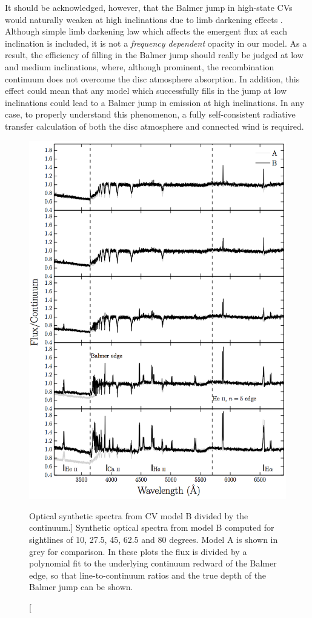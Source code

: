 It should be acknowledged, however,
that the Balmer jump in high-state CVs would naturally weaken at
high inclinations due to limb darkening effects \citep{ladous1989, ladous1989b}. 
Although simple limb darkening law which affects 
the emergent flux at each inclination is included,
it is not a {\em frequency dependent} opacity in our model.
As a result, the efficiency of filling in the Balmer jump
should really be judged at low and medium inclinations, 
where, although prominent, the recombination continuum does
not overcome the disc atmosphere absorption. 
In addition, this effect 
could mean that any model which successfully fills in the 
jump at low inclinations could lead to a Balmer jump 
in emission at high inclinations.
In any case, to properly understand this phenomenon, a fully self-consistent
radiative transfer calculation of both the disc atmosphere
and connected wind is required.

\begin{figure} 
\centering
\includegraphics[width=1.0\textwidth]{figures/05-cvpaper/modelb_opt_cont.png}
\caption
[Optical synthetic spectra from CV model B divided by the continuum.]{
Synthetic optical spectra from model B computed for 
sightlines of 10, 27.5, 45, 62.5 and 80 degrees. 
Model A is shown in grey for comparison.
In these plots the flux is divided by a polynomial fit to the 
underlying continuum redward of the Balmer edge, so that 
line-to-continuum ratios and the true depth of the
Balmer jump can be shown.
}
\label{continuumb}
\end{figure} 

